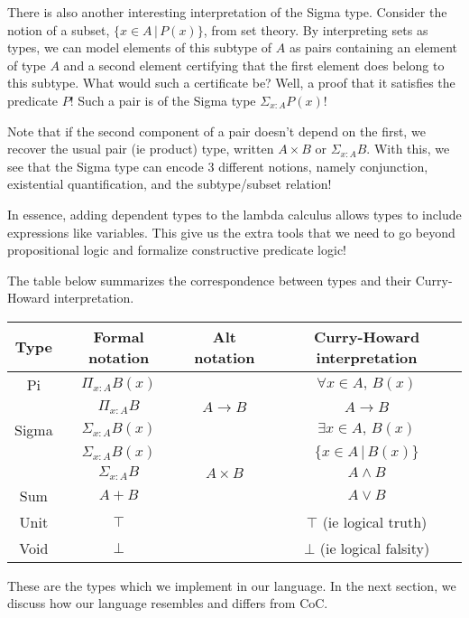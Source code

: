 \documentclass{article}
\begin{document}
There is also another interesting interpretation of the Sigma type.
Consider the notion of a subset, $\{x \in A \, | \, P(x) \}$, from set theory.
By interpreting sets as types, we can model elements of this subtype of $A$ as
pairs containing an element of type $A$ and a second element certifying that the
first element does belong to this subtype. What would such a certificate be?
Well, a proof that it satisfies the predicate $P$!
Such a pair is of the Sigma type $\Sigma_{x : A} P(x)$!

Note that if the second component of a pair doesn't depend on the first, we recover
the usual pair (ie product) type, written $A \times B$ or $\Sigma_{x : A} B$.
With this, we see that the Sigma type can encode 3 different notions, namely
conjunction, existential quantification, and the subtype/subset relation!

In essence, adding dependent types to the lambda calculus allows types to include
expressions like variables.
This give us the extra tools that we need to go beyond propositional logic and
formalize constructive predicate logic!

The table below summarizes the correspondence between types and their Curry-Howard
interpretation.

\begin{center}
\begin{tabular}{ |c|c|c|c| }
  \hline
 Type & Formal notation & Alt notation & Curry-Howard interpretation \\ 
 \hline
 Pi & $\Pi_{x : A}B(x)$ & & $\forall x \in A, \, B(x)$ \\  
    & $\Pi_{x : A}B$ & $A \rightarrow B$ & $A \rightarrow B$ \\  
    \hline
 Sigma & $\Sigma_{x : A}B(x)$ & & $\exists x \in A, \, B(x)$ \\
       & $\Sigma_{x : A}B(x)$ & & $\{ x \in A \, | \, B(x) \}$ \\
       & $\Sigma_{x : A}B$ & $A \times B$ & $A \wedge B$ \\
       \hline
 Sum & $A + B$ & & $A \vee B$ \\
 \hline
 Unit & $\top$ & & $\top$ (ie logical truth) \\
 \hline
 Void & $\bot$ & & $\bot$ (ie logical falsity) \\
 \hline
\end{tabular}
\end{center}

These are the types which we implement in our language.
In the next section, we discuss how our language resembles and differs from
CoC.
\end{document}
